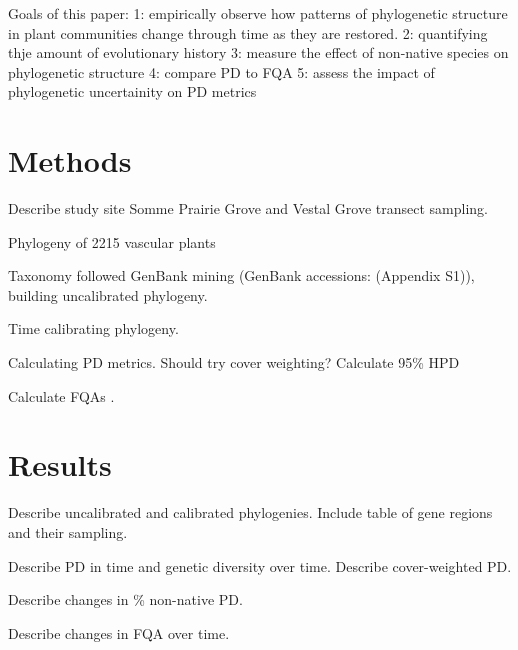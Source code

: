 \documentclass[twocolumn,superscriptaddress,showkeys]{revtex4}
\begin{document}
Goals of this paper:
1: empirically observe how patterns of phylogenetic structure in plant communities change through time as they are restored.
2: quantifying thje amount of evolutionary history
3: measure the effect of non-native species on phylogenetic structure
4: compare PD to FQA
5: assess the impact of phylogenetic uncertainity on PD metrics


\section{Methods}

Describe study site Somme Prairie Grove and Vestal Grove transect sampling.

Phylogeny of 2215 vascular plants

Taxonomy followed \cite{Herman2014} GenBank mining (GenBank accessions: (Appendix S1)), building uncalibrated phylogeny.


Time calibrating phylogeny.


Calculating PD metrics. Should try cover weighting? Calculate 95\% HPD


Calculate FQAs \cite{Freyman2013}.


\section{Results}

Describe uncalibrated and calibrated phylogenies. Include table of gene regions and their sampling.


Describe PD in time and genetic diversity over time. Describe cover-weighted PD.


Describe changes in \% non-native PD.


Describe changes in FQA over time.
\end{document}
